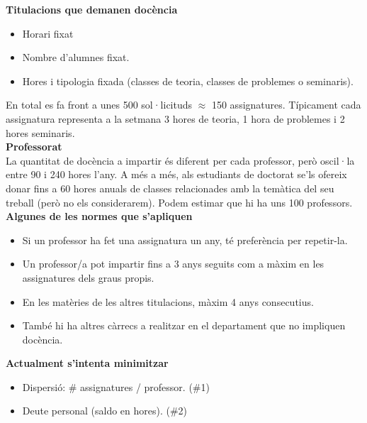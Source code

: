 \documentclass[10pt,twocolumn]{article}
\begin{document}
\begin{tcolorbox}[colback=black!1,title=\textbf{Dades del funcionament intern del \textit{model actual}},coltitle=black,colbacktitle=black!10]
	\textbf{Titulacions que demanen docència}
	\begin{itemize}
		\item Horari fixat
		\item Nombre d'alumnes fixat.
		\item Hores i tipologia fixada (classes de teoria, classes de problemes o seminaris).
	\end{itemize}
	En total es fa front a  unes 500 sol·licituds $\approx$ 150 assignatures. Típicament cada assignatura representa a la setmana 3 hores de teoria, 1 hora de problemes i 2 hores seminaris.
	\vspace{2mm}
	\\
	\textbf{Professorat}
	\\
	La quantitat de docència a impartir és diferent per cada professor, però oscil·la entre 90 i 240 hores l'any. A més a més, als estudiants de doctorat se'ls ofereix donar fins a 60 hores anuals de classes relacionades amb la temàtica del seu treball (però no els considerarem). Podem estimar que hi ha uns 100 professors.
	\vspace{2mm}
\\
	\textbf{Algunes de les normes que s'apliquen}
	\begin{itemize}
		\item Si un professor ha fet una assignatura un any, té preferència per repetir-la.
		\item Un professor/a pot impartir fins a 3 anys seguits com a màxim en les assignatures dels graus propis.
		\item En les matèries de les altres titulacions, màxim 4 anys consecutius.
		\item També hi ha altres càrrecs a realitzar en el departament que no impliquen docència.
	\end{itemize}
	\textbf{Actualment s'intenta minimitzar}
	\begin{itemize}
		\item Dispersió: \# assignatures / professor. (\#1)
		\item Deute personal (saldo en hores). (\#2)
	\end{itemize}
	\end{tcolorbox}
\end{document}
